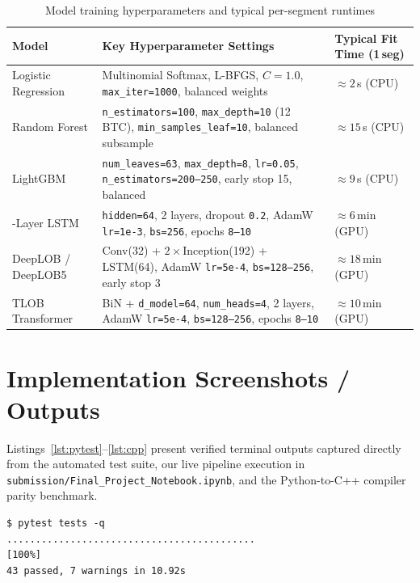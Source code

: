 \documentclass[12pt,a4paper,oneside]{report}
\newcommand{\code}[1]{\texttt{#1}}
\begin{document}
\begin{table}[H]
\centering\scriptsize
\setlength{\tabcolsep}{4pt}
\caption{Model training hyperparameters and typical per-segment runtimes}
\label{tab:hyperparams}
\begin{tabularx}{\linewidth}{@{}>{\raggedright\arraybackslash}p{3.0cm}>{\raggedright\arraybackslash}X>{\raggedright\arraybackslash}p{3.0cm}@{}}
\toprule
\textbf{Model} & \textbf{Key Hyperparameter Settings} & \textbf{Typical Fit Time (1\,seg)} \\
\midrule
Logistic Regression & Multinomial Softmax, L-BFGS, $C=1.0$, \code{max\_iter=1000}, balanced weights & $\approx 2$\,s (CPU) \\
Random Forest & \code{n\_estimators=100}, \code{max\_depth=10} (12 BTC), \code{min\_samples\_leaf=10}, balanced subsample & $\approx 15$\,s (CPU) \\
LightGBM & \code{num\_leaves=63}, \code{max\_depth=8}, \code{lr=0.05}, \code{n\_estimators=200--250}, early stop 15, balanced & $\approx 9$\,s (CPU) \\
2-Layer LSTM & \code{hidden=64}, 2 layers, dropout \code{0.2}, AdamW \code{lr=1e-3}, \code{bs=256}, epochs \code{8--10} & $\approx 6$\,min (GPU) \\
DeepLOB / DeepLOB5 & Conv(32) + $2\times$Inception(192) + LSTM(64), AdamW \code{lr=5e-4}, \code{bs=128--256}, early stop 3 & $\approx 18$\,min (GPU) \\
TLOB Transformer & BiN + \code{d\_model=64}, \code{num\_heads=4}, 2 layers, AdamW \code{lr=5e-4}, \code{bs=128--256}, epochs \code{8--10} & $\approx 10$\,min (GPU) \\
\bottomrule
\end{tabularx}
\end{table}

\section{Implementation Screenshots / Outputs}

Listings~\ref{lst:pytest}--\ref{lst:cpp} present verified terminal outputs captured directly from the automated test suite, our live pipeline execution in \code{submission/Final\_Project\_Notebook.ipynb}, and the Python-to-C++ compiler parity benchmark.

\begin{lstlisting}[style=console, caption={Automated pytest verification suite confirming causality, whole-day NSE boundary isolation, DeepLOB5 forward shapes, and simulator accounting (43 tests passed).}, label={lst:pytest}]
$ pytest tests -q
...........................................                              [100%]
43 passed, 7 warnings in 10.92s
\end{lstlisting}
\end{document}

